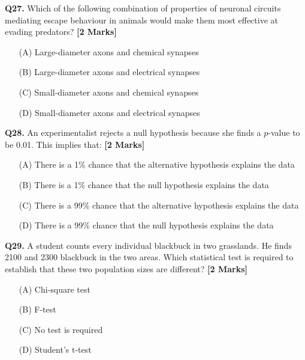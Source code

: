 \documentclass[11pt]{article}
\newcommand{\questionb}[2]{
    \noindent\textbf{Q#2.} #1 \hfill \textbf{[2 Marks]}
}
\begin{document}
\questionb{Which of the following combination of properties of neuronal circuits mediating escape behaviour in animals would make them most effective at evading predators?}{27}
\begin{enumerate}
    \item[(A)] Large-diameter axons and chemical synapses  
    \item[(B)] Large-diameter axons and electrical synapses  
    \item[(C)] Small-diameter axons and chemical synapses  
    \item[(D)] Small-diameter axons and electrical synapses  
\end{enumerate}
\vspace{0.5cm}

\questionb{An experimentalist rejects a null hypothesis because she finds a $p$-value to be 0.01. This implies that:}{28}
\begin{enumerate}
    \item[(A)] There is a 1\% chance that the alternative hypothesis explains the data  
    \item[(B)] There is a 1\% chance that the null hypothesis explains the data  
    \item[(C)] There is a 99\% chance that the alternative hypothesis explains the data  
    \item[(D)] There is a 99\% chance that the null hypothesis explains the data  
\end{enumerate}
\vspace{0.5cm}

\questionb{A student counts every individual blackbuck in two grasslands. He finds 2100 and 2300 blackbuck in the two areas. Which statistical test is required to establish that these two population sizes are different?}{29}
\begin{enumerate}
    \item[(A)] Chi-square test  
    \item[(B)] F-test  
    \item[(C)] No test is required  
    \item[(D)] Student's t-test  
\end{enumerate}
\vspace{0.5cm}
\end{document}
